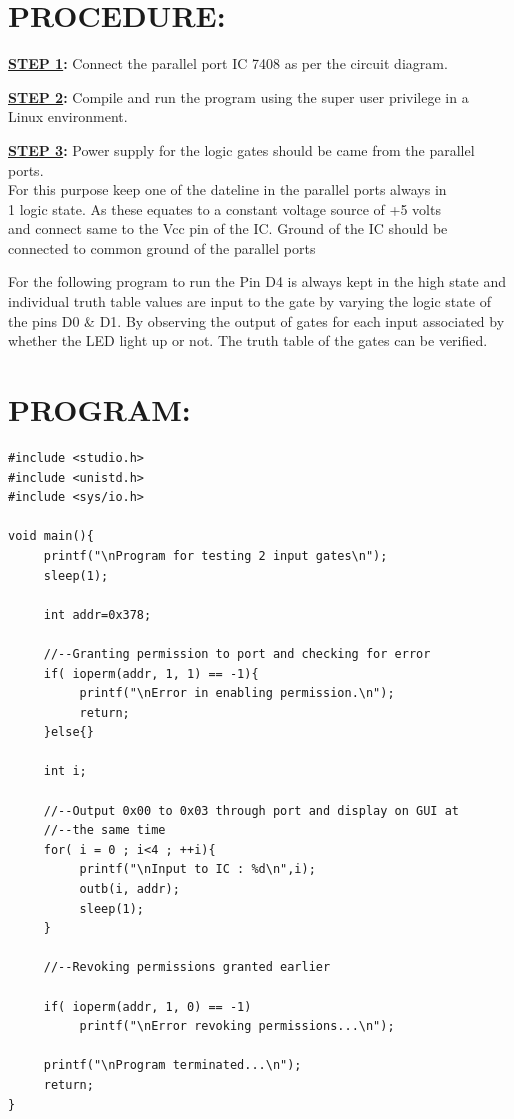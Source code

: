 \documentclass[a4paper,28pt,twoside,openright]{report}
\begin{document}
\section*{PROCEDURE:}

\textbf{\underline{STEP 1}:} Connect the parallel port IC 7408 as per the circuit diagram.

\textbf{\underline{STEP 2}:}  Compile and run the program using the super user privilege in a\\\hspace*{50pt} Linux environment.

\textbf{\underline{STEP 3}:}  Power supply for the logic gates should be came from the parallel ports.\\\hspace*{50pt}For this purpose keep one of the dateline in the parallel ports always in\\\hspace*{50pt}1 logic state.
As these equates to a constant voltage source of +5 volts\\\hspace*{50pt}and connect same to the Vcc pin of the IC. Ground of the IC should be\\\hspace*{50pt}connected to common ground of the parallel ports


For the following program to run the Pin D4 is always kept in the high state and individual truth table values are input to the gate by varying the logic state of the pins D0 \& D1. By observing the output of gates for each input associated by whether the LED light up or not. The truth table of the gates can be verified.


\section*{PROGRAM:}

\begin{lstlisting}
#include <studio.h>
#include <unistd.h>
#include <sys/io.h>

void main(){
     printf("\nProgram for testing 2 input gates\n");
     sleep(1);

     int addr=0x378;
     
     //--Granting permission to port and checking for error
     if( ioperm(addr, 1, 1) == -1){
          printf("\nError in enabling permission.\n");
          return;
     }else{}
     
     int i;
     
     //--Output 0x00 to 0x03 through port and display on GUI at
     //--the same time
     for( i = 0 ; i<4 ; ++i){
          printf("\nInput to IC : %d\n",i);
          outb(i, addr);
          sleep(1);
     }
     
     //--Revoking permissions granted earlier
     
     if( ioperm(addr, 1, 0) == -1)
          printf("\nError revoking permissions...\n");
     
     printf("\nProgram terminated...\n");
     return;
}

\end{lstlisting}
\end{document}
